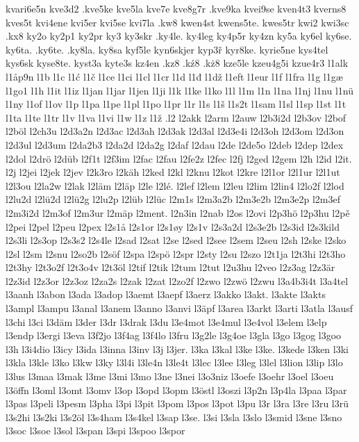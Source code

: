 {{kvari6e5n
kve3d2
.kve5ke
kve5la
kve7e
kve8g7r
.kve9ka
kvei9se
kven4t3
kverns8
kves5t
kvi4ene
kvi5er
kvi5se
kvi7la
.kw8
kwen4st
kwens5te.
kwes5tr
kwi2
kwi3sc
.kx8
ky2o
ky2p1
ky2pr
ky3
ky3skr
.ky4le.
ky4leg
ky4p5r
ky4zn
ky5a
ky6el
ky6se.
ky6ta.
.ky6te.
.ky8la.
ky8sa
kyf5le
kyn6skjer
kyp3ř
kyr8ke.
kyrie5ne
kys4tel
kys6sk
kyse8te.
kyst3a
kyte3s
kz4en
.kz8
.kź8
.kż8
kze5le
kzeu4g5i
kzue4r3
l1alk
l1åp9n
l1b
l1c
l1ć
l1č
l1ce
l1ci
l1cl
l1cr
l1d
l1đ
l1dž
l1eft
l1eur
l1f
l1fra
l1g
l1gæ
l1go1
l1h
l1it
l1iz
l1jan
l1jar
l1jen
l1ji
l1k
l1ke
l1ko
l1l
l1m
l1n
l1na
l1nj
l1nu
l1nü
l1ny
l1of
l1ov
l1p
l1pa
l1pe
l1pl
l1po
l1pr
l1r
l1s
l1š
l1s2t
l1sam
l1sl
l1sp
l1st
l1t
l1ta
l1te
l1tr
l1v
l1va
l1vi
l1w
l1z
l1ž
.l2
l2akk
l2arm
l2auw
l2b3i2d
l2b3ov
l2bof
l2böl
l2ch3u
l2d3a2n
l2d3ac
l2d3ah
l2d3ak
l2d3al
l2d3e4i
l2d3oh
l2d3om
l2d3on
l2d3ul
l2d3um
l2da2b3
l2da2d
l2da2g
l2daf
l2dau
l2de
l2de5o
l2deb
l2dep
l2dex
l2dol
l2drö
l2düb
l2f1t
l2f3im
l2fac
l2fau
l2fe2z
l2fec
l2fj
l2ged
l2gem
l2h
l2id
l2it.
l2j
l2jei
l2jek
l2jev
l2k3ro
l2käh
l2ked
l2kl
l2knu
l2kot
l2kre
l2l1or
l2l1ur
l2l1ut
l2l3ou
l2la2w
l2lak
l2läm
l2läp
l2le
l2lé.
l2lef
l2lem
l2leu
l2lim
l2lin4
l2lo2f
l2lod
l2lu2d
l2lü2d
l2lü2g
l2lu2p
l2lüb
l2lüc
l2m1s
l2m3a2b
l2m3e2b
l2m3e2p
l2m3ef
l2m3i2d
l2m3of
l2m3ur
l2mäp
l2ment.
l2n3in
l2nab
l2os
l2ovi
l2p3hö
l2p3hu
l2pě
l2pei
l2pel
l2peu
l2pex
l2s1å
l2s1or
l2s1øy
l2s1v
l2s3a2d
l2s3e2b
l2s3id
l2s3kild
l2s3li
l2s3op
l2s3s2
l2s4le
l2sad
l2sat
l2se
l2sed
l2see
l2sem
l2seu
l2sh
l2ske
l2sko
l2sl
l2sm
l2snu
l2so2b
l2söf
l2spa
l2spö
l2spr
l2sty
l2su
l2szo
l2t1ja
l2t3hi
l2t3ho
l2t3hy
l2t3o2f
l2t3o4v
l2t3öl
l2tif
l2tik
l2tum
l2tut
l2u3hu
l2veo
l2z3ag
l2z3är
l2z3id
l2z3or
l2z3oz
l2za2s
l2zak
l2zat
l2zo2f
l2zwo
l2zwö
l2zwu
l3a4b3i4t
l3a4tel
l3aanh
l3abon
l3ada
l3adop
l3aemt
l3aepf
l3aerz
l3akko
l3akt.
l3akte
l3akts
l3ampl
l3ampu
l3anal
l3anem
l3anno
l3anvi
l3äpf
l3area
l3arkt
l3arti
l3atla
l3ausf
l3chi
l3ci
l3däm
l3der
l3dr
l3drak
l3du
l3e4mot
l3e4mul
l3e4vol
l3elem
l3elp
l3endp
l3ergi
l3eva
l3f2jo
l3f4ag
l3f4lo
l3fru
l3g2le
l3g4oe
l3gla
l3go
l3gog
l3goo
l3h
l3i4dio
l3icy
l3ida
l3inna
l3inv
l3j
l3jer.
l3ka
l3kal
l3ke
l3ke.
l3kede
l3ken
l3ki
l3kla
l3kle
l3ko
l3kw
l3ky
l3l4i
l3le4n
l3le4t
l3lec
l3lee
l3leg
l3lel
l3lion
l3lip
l3lo
l3lus
l3maa
l3mak
l3me
l3mi
l3mo
l3ne
l3nei
l3o3niz
l3oefe
l3oehr
l3oel
l3oeu
l3öffn
l3oml
l3omt
l3omv
l3op
l3opd
l3opm
l3östl
l3oszi
l3p2n
l3p4la
l3paa
l3par
l3pas
l3peli
l3pesm
l3pha
l3pi
l3pit
l3pom
l3pos
l3pot
l3pu
l3r
l3ra
l3re
l3ru
l3rü
l3s2hi
l3s2ki
l3s2öl
l3s4ham
l3s4kel
l3sap
l3se.
l3si
l3sla
l3slo
l3smid
l3sne
l3sno
l3soc
l3soe
l3sol
l3span
l3spi
l3spoo
l3spor
}}
